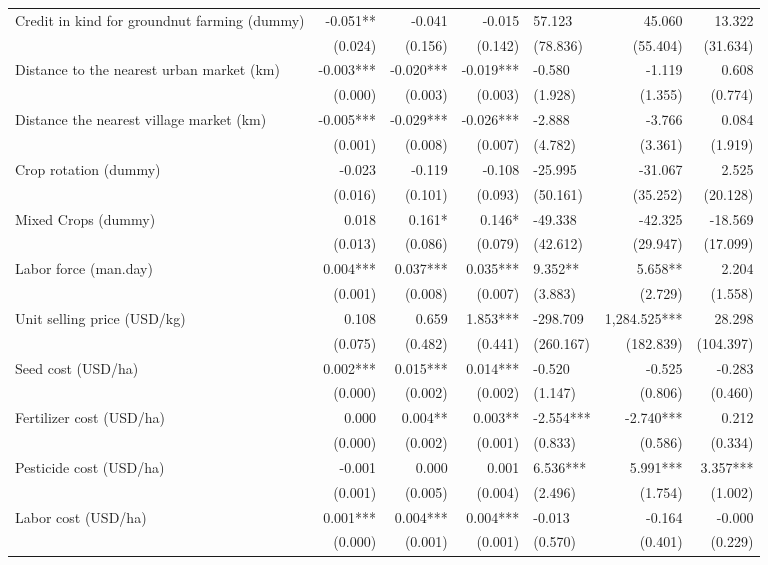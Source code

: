 \documentclass[
]{article}
\begin{document}
\begin{landscape}
\begin{longtable}[t]{lrrrlrr}
Credit in kind for groundnut farming (dummy) & -0.051** & -0.041 & -0.015 & 57.123 & 45.060 & 13.322\\
 & (0.024) & (0.156) & (0.142) & (78.836) & (55.404) & (31.634)\\
Distance to the nearest urban market (km) & -0.003*** & -0.020*** & -0.019*** & -0.580 & -1.119 & 0.608\\
\addlinespace
 & (0.000) & (0.003) & (0.003) & (1.928) & (1.355) & (0.774)\\
Distance the nearest village market (km) & -0.005*** & -0.029*** & -0.026*** & -2.888 & -3.766 & 0.084\\
 & (0.001) & (0.008) & (0.007) & (4.782) & (3.361) & (1.919)\\
Crop rotation (dummy) & -0.023 & -0.119 & -0.108 & -25.995 & -31.067 & 2.525\\
 & (0.016) & (0.101) & (0.093) & (50.161) & (35.252) & (20.128)\\
\addlinespace
Mixed Crops (dummy) & 0.018 & 0.161* & 0.146* & -49.338 & -42.325 & -18.569\\
 & (0.013) & (0.086) & (0.079) & (42.612) & (29.947) & (17.099)\\
Labor force (man.day) & 0.004*** & 0.037*** & 0.035*** & 9.352** & 5.658** & 2.204\\
 & (0.001) & (0.008) & (0.007) & (3.883) & (2.729) & (1.558)\\
Unit selling price (USD/kg) & 0.108 & 0.659 & 1.853*** & -298.709 & 1,284.525*** & 28.298\\
\addlinespace
 & (0.075) & (0.482) & (0.441) & (260.167) & (182.839) & (104.397)\\
Seed cost (USD/ha) & 0.002*** & 0.015*** & 0.014*** & -0.520 & -0.525 & -0.283\\
 & (0.000) & (0.002) & (0.002) & (1.147) & (0.806) & (0.460)\\
Fertilizer cost (USD/ha) & 0.000 & 0.004** & 0.003** & -2.554*** & -2.740*** & 0.212\\
 & (0.000) & (0.002) & (0.001) & (0.833) & (0.586) & (0.334)\\
\addlinespace
Pesticide cost (USD/ha) & -0.001 & 0.000 & 0.001 & 6.536*** & 5.991*** & 3.357***\\
 & (0.001) & (0.005) & (0.004) & (2.496) & (1.754) & (1.002)\\
Labor cost (USD/ha) & 0.001*** & 0.004*** & 0.004*** & -0.013 & -0.164 & -0.000\\
 & (0.000) & (0.001) & (0.001) & (0.570) & (0.401) & (0.229)\\

\end{longtable}
\end{landscape}
\end{document}
